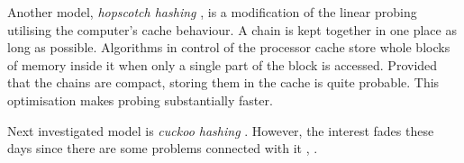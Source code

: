 Another model, \emph{hopscotch hashing} \cite{DBLP:conf/wdag/HerlihyST08}, is a modification of the linear probing utilising the computer's cache behaviour. A chain is kept together in one place as long as possible. Algorithms in control of the processor cache store whole blocks of memory inside it when only a single part of the block is accessed. Provided that the chains are compact, storing them in the cache is quite probable. This optimisation makes probing substantially faster.

Next investigated model is \emph{cuckoo hashing} \cite{782440}. However, the interest fades these days since there are some problems connected with it \cite{DBLP:conf/sofsem/DietzfelbingerS09}, \cite{1496857}.
